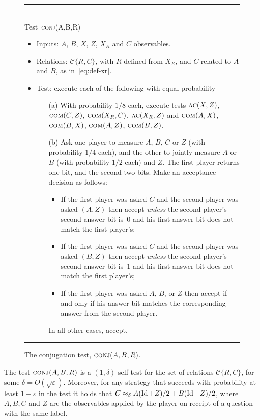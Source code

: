\documentclass{toc}
\newcommand{\Id}{\ensuremath{\mathop{\rm Id}\nolimits}}
\newcommand{\eps}{\varepsilon}
\newcommand{\conj}{\textsc{conj}}
\newcommand{\comt}{\textsc{com}}
\newcommand{\act}{\textsc{ac}}
\begin{document}
\newpage  %

\begin{figure}[H]
\rule[1ex]{\textwidth}{0.5pt}\\
Test~\conj(A,B,R) 
\begin{itemize}
\setlength\itemsep{-0.25em}   %
    \item Inputs: $A$, $B$, $X$, $Z$, $X_R$ and $C$ observables.
    \item Relations:  $\mathcal{C}\{R,C\} $, with $R$ defined from $X_R$, and $C$ related to $A$ and $B$, as in~\eqref{eq:def-xr}. 
    \item Test: execute each of the following with equal probability
      \begin{enumerate}
\setlength\itemsep{-0.17em}   %
\item[(a)] With probability $1/8$ each, execute tests $\act(X,Z)$,  $\comt(C,Z)$, $\comt(X_R,C)$,   $\act(X_R,Z)$ and $\comt(A,X)$, $\comt(B,X)$, $\comt(A,Z)$, $\comt(B,Z)$. 
\item[(b)] Ask one player to measure $A$, $B$, $C$ or $Z$ (with probability $1/4$ each), and the other to jointly measure $A$ or $B$ (with probability $1/2$ each) and $Z$. The first player returns one bit, and the second two bits. Make an acceptance decision as follows: 
\begin{itemize}
\item If the first player was asked $C$ and the second player was asked $(A,Z)$ then accept \emph{unless} the second player's second answer bit is~$0$ and his first answer bit does not match the first player's;
\item If the first player was asked $C$ and the second player was asked $(B,Z)$ then accept \emph{unless} the second player's second answer bit is~$1$ and his first answer bit does not match the first player's;
\item If the first player was asked $A$, $B$, or $Z$ then accept if and only if his answer bit matches the corresponding answer from the second player.
\end{itemize}
In all other cases, accept. 
\end{enumerate}
\end{itemize}
\rule[2ex]{\textwidth}{0.5pt}\vspace{-0.5cm}
\caption{The conjugation test, $\conj(A,B,R)$.}
\label{fig:conjugation-test-1}
\end{figure}

\begin{lemma}\label{lem:conj}
The test $\conj(A,B,R)$ is a $(1,\delta)$ self-test for the set of relations
  $\mathcal{C}\{R,C\}$, for some $\delta = O(\sqrt{\eps})$. Moreover, for any
  strategy that succeeds with probability at least $1-\eps$ in the test it holds
  that $C \approx_{\delta} A  (\Id+Z)/2 + B
 (\Id-Z)/2$, where $A,B,C$ and $Z$ are the observables applied by the player on receipt of a question with the same label. 
\end{lemma}
\end{document}
